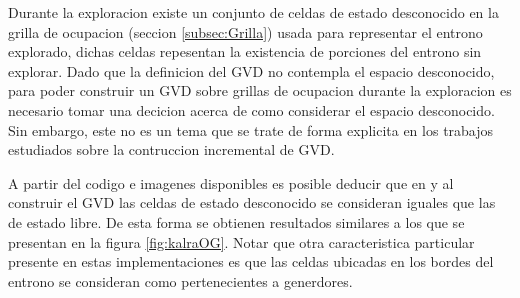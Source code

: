 



Durante la exploracion existe un conjunto de celdas de estado desconocido en la
grilla de ocupacion (seccion \ref{subsec:Grilla}) usada para representar el
entrono explorado, dichas celdas repesentan la existencia de porciones del
entrono sin explorar. Dado que la definicion del GVD no contempla el espacio
desconocido, para poder construir un GVD sobre grillas de ocupacion durante la
exploracion es necesario tomar una decicion acerca de como considerar el 
espacio desconocido. Sin embargo, este no es un tema que se trate de forma
explicita en los trabajos estudiados sobre la contruccion incremental de GVD. 

A partir del codigo e imagenes disponibles es posible deducir que en
\cite{kalra2009incremental} y \cite{Lau2013} al construir el GVD las celdas de
estado desconocido se consideran iguales que las de estado libre. De esta
forma se obtienen resultados similares a los que se presentan en la figura
\ref{fig:kalraOG}. Notar que otra caracteristica particular presente en estas
implementaciones es que las celdas ubicadas en los bordes del entrono se
consideran como pertenecientes a generdores.



